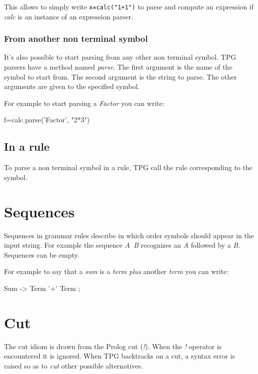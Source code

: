 This allows to simply write \verb!x=calc("1+1")! to parse and compute an expression if \emph{calc} is an instance of an expression parser.

\subsubsection{From another non terminal symbol}

It's also possible to start parsing from any other non terminal symbol.
TPG parsers have a method named \emph{parse}.
The first argument is the name of the symbol to start from.
The second argument is the string to parse.
The other arguments are given to the specified symbol.

For example to start parsing a \emph{Factor}
you can write:
\begin{verbatimtab}[4]
	f=calc.parse('Factor', "2*3")
\end{verbatimtab}

\subsection{In a rule}

To parse a non terminal symbol in a rule, TPG call the rule corresponding to the symbol.

\section{Sequences}												\label{parser:sequences}

Sequences in grammar rules describe in which order symbols should appear in the input string.
For example the sequence \emph{A~B} recognizes an \emph{A} followed by a \emph{B}.
Sequences can be empty.

For example to say that a \emph{sum} is a \emph{term} \emph{plus} another \emph{term} you can write:
\begin{verbatimtab}[4]
	Sum -> Term '+' Term ;
\end{verbatimtab}

\section{Cut}													\label{parser:cut}

The cut idiom is drawn from the Prolog cut (\emph{!}).
When the \emph{!} operator is encountered it is ignored.
When TPG backtracks on a cut, a syntax error is raised so as to \emph{cut}
other possible alternatives.

